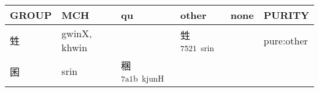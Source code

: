 \documentclass[14pt,a4paper]{scrartcl}
\begin{document}
\begin{longtable}[c]{@{}llllll@{}}
\toprule
\begin{minipage}[b]{0.14\columnwidth}\raggedright\strut
GROUP
\strut\end{minipage} &
\begin{minipage}[b]{0.14\columnwidth}\raggedright\strut
MCH
\strut\end{minipage} &
\begin{minipage}[b]{0.14\columnwidth}\raggedright\strut
qu
\strut\end{minipage} &
\begin{minipage}[b]{0.14\columnwidth}\raggedright\strut
other
\strut\end{minipage} &
\begin{minipage}[b]{0.14\columnwidth}\raggedright\strut
none
\strut\end{minipage} &
\begin{minipage}[b]{0.14\columnwidth}\raggedright\strut
PURITY
\strut\end{minipage}\tabularnewline
\midrule
\endhead
\begin{minipage}[t]{0.14\columnwidth}\raggedright\strut
甡
\strut\end{minipage} &
\begin{minipage}[t]{0.14\columnwidth}\raggedright\strut
gwinX, khwin
\strut\end{minipage} &
\begin{minipage}[t]{0.14\columnwidth}\raggedright\strut
\strut\end{minipage} &
\begin{minipage}[t]{0.14\columnwidth}\raggedright\strut
甡\textsuperscript{7521~srin}
\strut\end{minipage} &
\begin{minipage}[t]{0.14\columnwidth}\raggedright\strut
\strut\end{minipage} &
\begin{minipage}[t]{0.14\columnwidth}\raggedright\strut
pure:other
\strut\end{minipage}\tabularnewline
\begin{minipage}[t]{0.14\columnwidth}\raggedright\strut
囷
\strut\end{minipage} &
\begin{minipage}[t]{0.14\columnwidth}\raggedright\strut
srin
\strut\end{minipage} &
\begin{minipage}[t]{0.14\columnwidth}\raggedright\strut
稛\textsuperscript{7a1b~kjunH}
\strut\end{minipage} &

\end{longtable}
\end{document}
